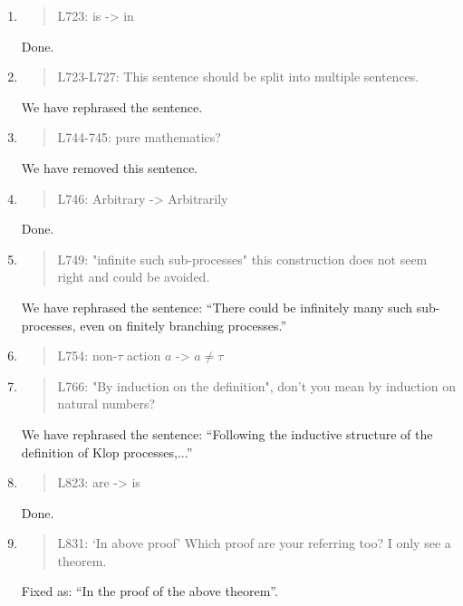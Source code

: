\begin{enumerate}
\item \begin{quote}
    L723: is -> in
  \end{quote}
  Done.
  
\item \begin{quote}
    L723-L727: This sentence should be split into multiple sentences.
  \end{quote}
  We have rephrased the sentence.
  
\item \begin{quote}
    L744-745: pure mathematics?
  \end{quote}
  We have removed this sentence.
  
\item \begin{quote}
    L746: Arbitrary -> Arbitrarily
  \end{quote}
  Done.
  
\item \begin{quote}
    L749: "infinite such sub-processes" this construction does not seem right and could be avoided.
  \end{quote}
  We have rephrased the sentence: ``There could be infinitely many such sub-processes, even on finitely
  branching processes.''
  
\item \begin{quote}
    L754: non-$\tau$ action $a$ -> $a\neq\tau$
  \end{quote}

\item \begin{quote}
    L766: "By induction on the definition", don't you mean by induction on natural numbers?
  \end{quote}
  We have rephrased the sentence: ``Following the inductive structure
  of the definition of Klop processes,...''
  
\item \begin{quote}
    L823: are -> is
  \end{quote}
  Done.
  
\item \begin{quote}
    L831: `In above proof’ Which proof are your referring too? I only see a theorem.
  \end{quote}
  Fixed as: ``In the proof of the above theorem''.
  

\end{enumerate}
